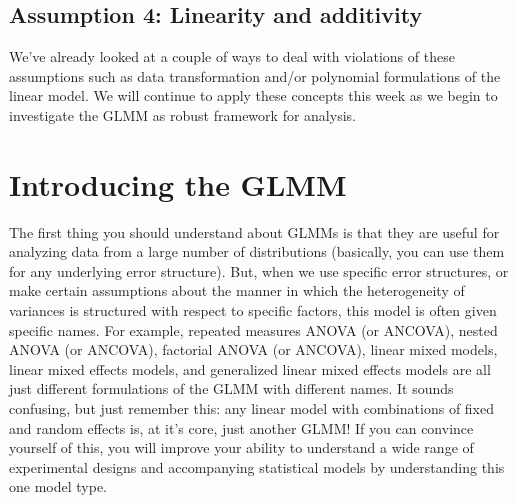 \documentclass[
]{book}
\begin{document}
\hypertarget{linearity-14}{%
\subsection{Assumption 4: Linearity and additivity}\label{linearity-14}}

We've already looked at a couple of ways to deal with violations of these assumptions such as data transformation and/or polynomial formulations of the linear model. We will continue to apply these concepts this week as we begin to investigate the GLMM as robust framework for analysis.

\hypertarget{introducing-the-glmm}{%
\section{Introducing the GLMM}\label{introducing-the-glmm}}

The first thing you should understand about GLMMs is that they are useful for analyzing data from a large number of distributions (basically, you can use them for any underlying error structure). But, when we use specific error structures, or make certain assumptions about the manner in which the heterogeneity of variances is structured with respect to specific factors, this model is often given specific names. For example, repeated measures ANOVA (or ANCOVA), nested ANOVA (or ANCOVA), factorial ANOVA (or ANCOVA), linear mixed models, linear mixed effects models, and generalized linear mixed effects models are all just different formulations of the GLMM with different names. It sounds confusing, but just remember this: any linear model with combinations of fixed and random effects is, at it's core, just another GLMM! If you can convince yourself of this, you will improve your ability to understand a wide range of experimental designs and accompanying statistical models by understanding this one model type.
\end{document}
